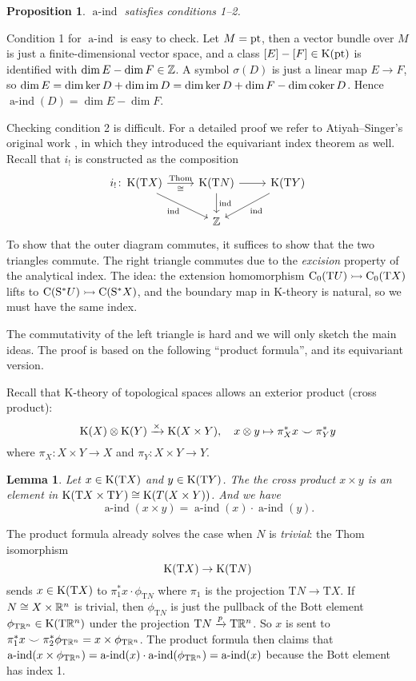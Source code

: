 \documentclass[reqno]{scrartcl}
\newtheorem{lemma}[theorem]{Lemma}
\newtheorem{proposition}[theorem]{Proposition}
\theoremstyle{definition}
\theoremstyle{remark}
\newcommand{\aind}{\operatorname{a-ind}}
\newcommand{\Thom}{\text{Thom}}
\renewcommand{\cup}{\smile}
\begin{document}
\begin{proposition}
$\aind$ satisfies conditions 1--2.
\end{proposition}

Condition 1 for $\aind$ is easy to check. Let $M=\operatorname{pt}$, then a vector bundle over $M$ is just a finite-dimensional vector space, and a class $[E]-[F]\in\operatorname{K}(\operatorname{pt})$ is identified with $\dim E-\dim F\in\mathbb{Z}$. A symbol $\sigma(D)$ is just a linear map $E\to F$, so $\dim E=\dim\operatorname{ker} D+\dim\operatorname{im} D=\dim\operatorname{ker} D+\dim F-\dim\operatorname{coker} D$. Hence $\aind(D)=\dim E-\dim F$.

Checking condition 2 is difficult. For a detailed proof we refer to Atiyah--Singer's original work \cite{atiyahsinger1}, in which they introduced the equivariant index theorem as well. Recall that $i_!$ is constructed as the composition
\[ \begin{tikzcd}
i_!\colon\K(\mathrm{T}X) \arrow[r, "\Thom", "\cong"'] \arrow[rd, "\ind"'] & \K(\mathrm{T}N)  \arrow[d, "\ind"] \arrow[r] & \K(\mathrm{T}Y) \arrow[ld, "\ind"] \\
                                                       & \Z                                 &                          
\end{tikzcd} \]
To show that the outer diagram commutes, it suffices to show that the two triangles commute. The right triangle commutes due to the \emph{excision} property of the analytical index. The idea: the extension homomorphism $\mathrm{C}_0(\mathrm{T}U)\rightarrowtail\mathrm{C}_0(\mathrm{T}X)$ lifts to $\mathrm{C}(\mathrm{S}^*U)\rightarrowtail\mathrm{C}(\mathrm{S}^*X)$, and the boundary map in K-theory is natural, so we must have the same index.

The commutativity of the left triangle is hard and we will only sketch the main ideas. The proof is based on the following ``product formula'', and its equivariant version.

Recall that K-theory of topological spaces allows an exterior product (cross product):
\[ \K(X)\otimes\K(Y)\xrightarrow{\times}\K(X\times Y),\quad x\otimes y\mapsto\pi_X^*x\cup\pi_Y^*y \]
where $\pi_X\colon X\times Y\to X$ and $\pi_Y\colon X\times Y\to Y$.

\begin{lemma}
Let $x\in\operatorname{K}(\mathrm{T}X)$ and $y\in\operatorname{K}(\mathrm{T}Y)$. The the cross product $x\times y$ is an element in $\operatorname{K}(\mathrm{T}X\times \mathrm{T}Y)\cong\operatorname{K}(T(X\times Y))$. And we have
\[ \aind(x\times y)=\aind(x)\cdot\aind(y). \]
\end{lemma}
The product formula already solves the case when $N$ is \emph{trivial}: the Thom isomorphism
\[ \operatorname{K}(\mathrm{T}X)\to\operatorname{K}(\mathrm{T}N) \]
sends $x\in\operatorname{K}(\mathrm{T}X)$ to $\pi_1^*x\cdot\phi_{\mathrm{T}N}$ where $\pi_1$ is the projection $\mathrm{T}N\to \mathrm{T}X$. If $N\cong X\times \mathbb{R}^n$ is trivial, then $\phi_{\mathrm{T}N}$ is just the pullback of the Bott element $\phi_{\mathrm{T}\mathbb{R}^n}\in\operatorname{K}(\mathrm{T}\mathbb{R}^n)$ under the projection $\mathrm{T}N\xrightarrow{p} \mathrm{T}\mathbb{R}^n$. So $x$ is sent to $\pi_1^*x\cup\pi_2^*\phi_{\mathrm{T}\R^{n}}=x\times\phi_{\mathrm{T}\R^{n}}$. The product formula then claims that $\aind(x\times\phi_{\mathrm{T}\R^{n}})=\aind(x)\cdot\aind(\phi_{\mathrm{T}\R^{n}})=\aind(x)$ because the Bott element has index 1.
\end{document}
